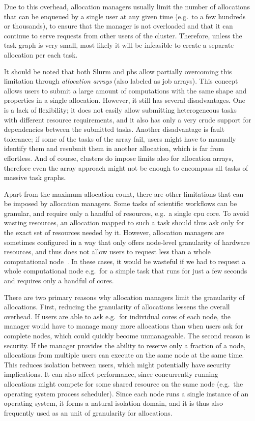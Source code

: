 Due to this overhead, allocation managers usually limit the number of allocations that can be
enqueued by a single user at any given time (e.g.\ to a few hundreds or thousands), to ensure that
the manager is not overloaded and that it can continue to serve requests from other users of the
cluster. Therefore, unless the task graph is very small, most likely it will be infeasible to
create a separate allocation per each task.

It should be noted that both Slurm and \gls{pbs} allow partially overcoming this
limitation through \emph{allocation arrays} (also labeled as job arrays). This concept allows users to submit a large amount
of computations with the same shape and properties in a single allocation. However, it still has
several disadvantages. One is a lack of flexibility; it does not easily allow submitting
heterogeneous tasks with different resource requirements, and it also has only a very crude support
for dependencies between the submitted tasks. Another disadvantage is fault tolerance; if some of
the tasks of the array fail, users might have to manually identify them and resubmit them in
another allocation, which is far from effortless. And of course, clusters do impose limits also for
allocation arrays, therefore even the array approach might not be enough to encompass all tasks of
massive task graphs.

Apart from the maximum allocation count, there are other limitations that can be imposed by
allocation managers. Some tasks of scientific workflows can be granular, and require only a
handful of resources, e.g.\ a single \gls{cpu} core. To avoid wasting resources,
an allocation mapped to such a task should thus ask only for the exact set of resources needed by
it. However, allocation managers are sometimes configured in a way that only offers node-level
granularity of hardware resources, and thus does not allow users to request less than a whole
computational node~\cite{it4i_node_scheduling_policy}. In these cases, it would be wasteful if we had
to request a whole computational node e.g.\ for a simple task that runs for just a few seconds and
requires only a handful of cores.

There are two primary reasons why allocation managers limit the granularity of allocations. First,
reducing the granularity of allocations lessens the overall overhead. If users are able to ask
e.g.\ for individual cores of each node, the manager would have to manage many more allocations
than when users ask for complete nodes, which could quickly become unmanageable. The second reason
is security. If the manager provides the ability to reserve only a fraction of a node, allocations
from multiple users can execute on the same node at the same time. This reduces isolation between
users, which might potentially have security implications. It can also affect performance, since
concurrently running allocations might compete for some shared resource on the same node (e.g.\ the
operating system process scheduler). Since each node runs a single instance of an operating system,
it forms a natural isolation domain, and it is thus also frequently used as an unit of granularity
for allocations.

